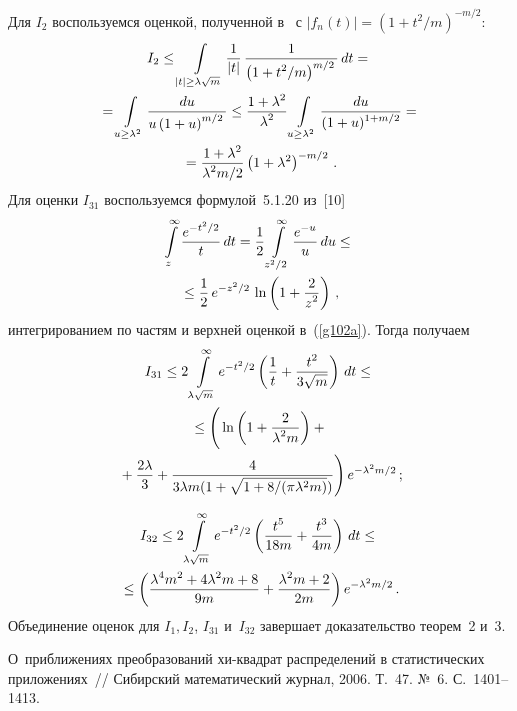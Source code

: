 \begin{multicols}{2}
Для $I_2$ воспользуемся оценкой, полученной в~\cite{1-cr}    с 
$|f_n(t)| = (1+ t^2/m)^{-m/2}$:
\begin{multline*}
I_2 \leq \int\limits_{|t|\geq \lambda\sqrt{m}} \fr{1}{|t|} \,\fr{1}{\left(1+t^2/m\right)^{m/2}}\,dt
={}\\
{}=  \int\limits_{u\geq \lambda^2} \fr{du}{u\left(1+u \right)^{m/2}}\leq
 \fr{1+\lambda^2}{\lambda^2}\int\limits_{u\geq \lambda^2} \fr{du}{(1+u )^{1+m/2}}={}\\
 {}= \fr{1+\lambda^2}{\lambda^2m/2}\left(1+\lambda^2 \right)^{-m/2}\,.
\end{multline*}
Для оценки   $I_{31}$ воспользуемся формулой~5.1.20 из~[10]
\begin{multline*} 
\int\limits_z^{\infty} \fr{e^{-t^2/2}}{t}\,dt= \fr{1}{2}\int\limits_{z^2/2}^{\infty}\fr{e^{-u}}{u}\, du \leq{}\\
{}\leq
\fr{1}{2}\, e^{-z^2/2}\,\ln\left(1+\fr{2}{z^2}\right) \,,
\end{multline*}
интегрированием по частям и верхней оценкой в~(\ref{g102a}). Тогда получаем
\begin{multline*} 
I_{31} \leq 2\int\limits_{\lambda\sqrt{m}}^{\infty} e^{-t^2/2}
\left(\fr{1}{t} + \fr{t^2}{3\sqrt{m}} \right)\, dt \leq{}\\
{} \leq \left( 
\vphantom{\fr{4}{\sqrt{\lambda^2}}}
\ln\left(1+\fr{2}{\lambda^2m}\right)+ {}\right.\\
\left.{}+
\fr{2\lambda}{3}+\fr{4}{3\lambda m(1+\sqrt{1+8/(\pi \lambda^2 m)})}\right) e^{-\lambda^2m/2}\,;
\end{multline*}

\noindent
\begin{multline*}
I_{32} \leq  2\int\limits_{\lambda\sqrt{m}}^{\infty} e^{-t^2/2}
\left(\fr{t^5}{18m} + \fr{t^3}{4m}\right)\, dt
 \leq{} \\
{} \leq \left( \fr{\lambda^4m^2 + 4\lambda^2 m +8}{9m} + 
\fr{\lambda^2m + 2}{2m}\right)e^{-\lambda^2m/2} \,.
\end{multline*}
Объединение оценок для   $I_1, I_2$, $I_{31}$ и~$I_{32}$ завершает доказательство теорем~2 и~3.

{\small\frenchspacing
{%
\begin{thebibliography}{99}

  О~приближениях
преобразований хи-квадрат распределений в статистических приложениях~//
Сибирский математический журнал, 2006. Т.~47. №\, 6. С.~1401--1413.


\end{thebibliography}}}
\end{multicols}
